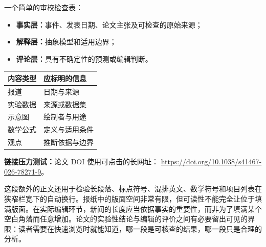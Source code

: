 \documentclass[10pt]{article}
\begin{document}
\begin{documents}
{一个简单的审校检查表：
\begin{itemize}
\item \textbf{事实层：}事件、发表日期、论文主张及可检查的原始来源；
\item \textbf{解释层：}抽象模型和适用边界；
\item \textbf{评论层：}具有不确定性的预测或编辑判断。
\end{itemize}

\begin{center}
\begin{tabular}{@{}ll@{}}
\toprule
内容类型 & 应标明的信息\\
\midrule
报道 & 日期与来源\\
实验数据 & 来源或数据集\\
示意图 & 绘制者与用途\\
数学公式 & 定义与适用条件\\
观点 & 推断依据与边界\\
\bottomrule
\end{tabular}
\end{center}

\textbf{链接压力测试：}论文 DOI 使用可点击的长网址：
\url{https://doi.org/10.1038/s41467-026-78271-9}。

这段额外的正文还用于检验长段落、标点符号、混排英文、数学符号和项目列表在狭窄栏宽下的自动换行。报纸中的版面空间非常有限，但可读性不能完全让位于填满版面。在实际编辑环节，新闻的长度应当依据事实的重要性，而非为了填满某个空白角落而任意增加。论文的实验性结论与编辑的评价之间有必要留出可见的界限：读者需要在快速浏览时就能知道，哪一段是可核查的结果，哪一段只是合理的分析。
}


\end{documents}


\end{document}
